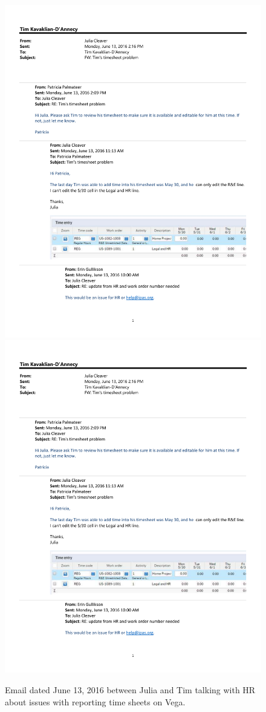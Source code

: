 \begin{figure}
   \centering
       \noindent\includegraphics[page=1,width=.45\textwidth]{documents/2016-06-13-Email-Julia} \hfill 
       \noindent\includegraphics[page=2,width=.45\textwidth]{documents/2016-06-13-Email-Julia} 
 \caption{Email dated June 13, 2016 between Julia and Tim talking with HR about issues with reporting time sheets on Vega.}
 \label{fig:2016-06-13-Email-Julia}
\end{figure}
\clearpage

